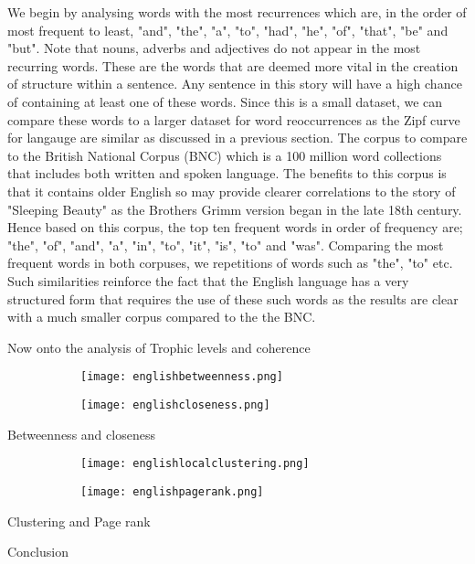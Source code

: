 We begin by analysing words with the most recurrences which are, in the order of most frequent to least, "and", "the", "a", "to", "had", "he", "of", "that", "be" and "but". Note that nouns, adverbs and adjectives do not appear in the most recurring words. These are the words that are deemed more vital in the creation of structure within a sentence. Any sentence in this story will have a high chance of containing at least one of these words. Since this is a small dataset, we can compare these words to a larger dataset for word reoccurrences as the Zipf curve for langauge are similar as discussed in a previous section. The corpus to compare to the British National Corpus (BNC)\cite{bnc2007british} which is a 100 million word collections that includes both written and spoken language. The benefits to this corpus is that it contains older English so may provide clearer correlations to the story of "Sleeping Beauty" as the Brothers Grimm version began in the late 18th century. Hence based on this corpus, the top ten frequent words\cite{leech2014word} in order of frequency are; "the", "of", "and", "a", "in", "to", "it", "is", "to" and "was". Comparing the most frequent words in both corpuses, we repetitions of words such as "the", "to" etc. Such similarities reinforce the fact that the English language has a very structured form that requires the use of these such words as the results are clear with a much smaller corpus compared to the the BNC.

Now onto the analysis of Trophic levels and coherence 

\begin{figure}[H]
\centering
\begin{subfigure}{.45\textwidth}
	\hspace{-1cm} 
	\texttt{[image: englishbetweenness.png]}
	\caption{}
	\label{fig:engbc}
\end{subfigure}
\hfill
\begin{subfigure}{.45\textwidth}
	\hspace{-1cm} 
	\texttt{[image: englishcloseness.png]}
	\caption{}
	\label{fig:engcc}
\end{subfigure}
\end{figure}

Betweenness and closeness

\begin{figure}[H]
\centering
\begin{subfigure}{.45\textwidth}
	\hspace{-1cm} 
	\texttt{[image: englishlocalclustering.png]}
	\caption{}
	\label{fig:englc}
\end{subfigure}
\hfill
\begin{subfigure}{.45\textwidth}
	\hspace{-1cm} 
	\texttt{[image: englishpagerank.png]}
	\caption{}
	\label{fig:engpr}
\end{subfigure}
\end{figure}

Clustering and Page rank

Conclusion
